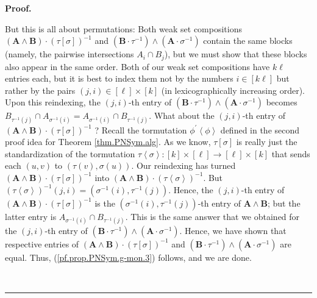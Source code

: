\documentclass[numbers=enddot,12pt,final,onecolumn,notitlepage]{scrartcl}%
\theoremstyle{definition}
\newenvironment{fineprint}{\begin{small}}{\end{small}}
\newenvironment{proof}[1][Proof]{\noindent\textbf{#1.} }{\ \rule{0.5em}{0.5em}}
\begin{document}
\begin{proof}
\begin{fineprint}
But this is all about permutations: Both weak set compositions $\left(
\mathbf{A}\wedge\mathbf{B}\right)  \cdot\left(  \tau\left[  \sigma\right]
\right)  ^{-1}$ and $\left(  \mathbf{B}\cdot\tau^{-1}\right)  \wedge\left(
\mathbf{A}\cdot\sigma^{-1}\right)  $ contain the same blocks (namely, the
pairwise intersections $A_{i}\cap B_{j}$), but we must show that these blocks
also appear in the same order. Both of our weak set compositions have $k\ell$
entries each, but it is best to index them not by the numbers $i\in\left[
k\ell\right]  $ but rather by the pairs $\left(  j,i\right)  \in\left[
\ell\right]  \times\left[  k\right]  $ (in lexicographically increasing
order). Upon this reindexing, the $\left(  j,i\right)  $-th entry of $\left(
\mathbf{B}\cdot\tau^{-1}\right)  \wedge\left(  \mathbf{A}\cdot\sigma
^{-1}\right)  $ becomes $B_{\tau^{-1}\left(  j\right)  }\cap A_{\sigma
^{-1}\left(  i\right)  }=A_{\sigma^{-1}\left(  i\right)  }\cap B_{\tau
^{-1}\left(  j\right)  }$. What about the $\left(  j,i\right)  $-th entry of
$\left(  \mathbf{A}\wedge\mathbf{B}\right)  \cdot\left(  \tau\left[
\sigma\right]  \right)  ^{-1}$ ? Recall the tormutation $\phi^{\prime
}\left\langle \phi\right\rangle $ defined in the second proof idea for Theorem
\ref{thm.PNSym.alg}. As we know, $\tau\left[  \sigma\right]  $ is really just
the standardization of the tormutation $\tau\left\langle \sigma\right\rangle
:\left[  k\right]  \times\left[  \ell\right]  \rightarrow\left[  \ell\right]
\times\left[  k\right]  $ that sends each $\left(  u,v\right)  $ to $\left(
\tau\left(  v\right)  ,\sigma\left(  u\right)  \right)  $. Our reindexing has
turned $\left(  \mathbf{A}\wedge\mathbf{B}\right)  \cdot\left(  \tau\left[
\sigma\right]  \right)  ^{-1}$ into $\left(  \mathbf{A}\wedge\mathbf{B}%
\right)  \cdot\left(  \tau\left\langle \sigma\right\rangle \right)  ^{-1}$.
But $\left(  \tau\left\langle \sigma\right\rangle \right)  ^{-1}\left(
j,i\right)  =\left(  \sigma^{-1}\left(  i\right)  ,\tau^{-1}\left(  j\right)
\right)  $. Hence, the $\left(  j,i\right)  $-th entry of $\left(
\mathbf{A}\wedge\mathbf{B}\right)  \cdot\left(  \tau\left[  \sigma\right]
\right)  ^{-1}$ is the $\left(  \sigma^{-1}\left(  i\right)  ,\tau^{-1}\left(
j\right)  \right)  $-th entry of $\mathbf{A}\wedge\mathbf{B}$; but the latter
entry is $A_{\sigma^{-1}\left(  i\right)  }\cap B_{\tau^{-1}\left(  j\right)
}$. This is the same answer that we obtained for the $\left(  j,i\right)  $-th
entry of $\left(  \mathbf{B}\cdot\tau^{-1}\right)  \wedge\left(
\mathbf{A}\cdot\sigma^{-1}\right)  $. Hence, we have shown that respective
entries of $\left(  \mathbf{A}\wedge\mathbf{B}\right)  \cdot\left(
\tau\left[  \sigma\right]  \right)  ^{-1}$ and $\left(  \mathbf{B}\cdot
\tau^{-1}\right)  \wedge\left(  \mathbf{A}\cdot\sigma^{-1}\right)  $ are
equal. Thus, (\ref{pf.prop.PNSym.g-mon.3}) follows, and we are done.
\end{fineprint}
\end{proof}
\end{document}
